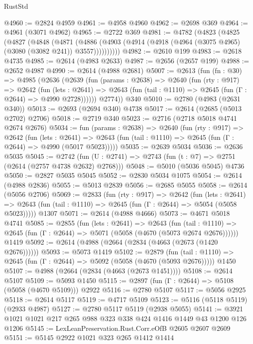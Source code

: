 \begin{lexlean}{RustStd}
\begin{coremodule}
@4960 := @2824 @4959
@4961 := @4958 @4960
@4962 := @2698 @369
@4964 := @4961 (@3071 @4962)
@4965 := @2722 @369
@4981 := @4782
    (@4823
      (@4825
        (@4827
          (@4848
            (@4871
              (@4886 (@4903 (@4914 (@4918 (@4964 (@3075 @4965) (@3080 (@3082 @241)) @3557))))))))))
@4982 := @2610 @199
@4983 := @2618 @4735
@4985 := @2614 (@4983 @2633)
@4987 := @2656 (@2657 @199)
@4988 := @2652 @4987
@4990 := @2614 (@4988 @2681)
@5007 := @2613
    (fun (fn : @30) =>
    @4985
      (@2636
        (@2639
          (fun (params : @2638) =>
          @2640
            (fun (rty : @917) =>
            @2642
              (fun (lets : @2641) =>
              @2643 (fun (tail : @1110) => @2645 (fun (Γ : @2644) => @4990 @2728))))))
        @2774))
    @340
@5010 := @2780 (@4983 (@2631 @340))
@5013 := @2693 (@2694 @340) @4738
@5017 := @2614 (@2685 (@5013 @2702) @2706)
@5018 := @2719 @340
@5023 := @2716 (@2718 @5018 @4741 @2674 @2676)
@5034 := fun (params : @2638) =>
  @2640
    (fun (rty : @917) =>
    @2642
      (fun (lets : @2641) =>
      @2643 (fun (tail : @1110) => @2645 (fun (Γ : @2644) => @4990 (@5017 @5023)))))
@5035 := @2639 @5034
@5036 := @2636 @5035
@5045 := @2742 (fun (U : @2741) => @2743 (fun (t : @7) => @2751 (@2614 (@2757 @4738 @2632) @2768)))
@5048 := @5010 (@5036 @5045) @4736
@5050 := @2827 @5035 @5045
@5052 := @2830 @5034 @1075
@5054 := @2614 (@4988 @2836)
@5055 := @5013 @2839
@5056 := @2685 @5055
@5058 := @2614 (@5056 @2706)
@5069 := @2833
    (fun (rty : @917) =>
    @2642
      (fun (lets : @2641) =>
      @2643 (fun (tail : @1110) => @2645 (fun (Γ : @2644) => @5054 (@5058 @5023)))))
    @1307
@5071 := @2614 (@4988 @4666)
@5073 := @4671 @5018 @4741
@5085 := @2855
    (fun (lets : @2641) =>
    @2643
      (fun (tail : @1110) => @2645 (fun (Γ : @2644) => @5071 (@5058 (@4670 (@5073 @2674 @2676))))))
    @1419
@5092 := @2614 (@4988 (@2664 (@2834 (@4663 (@2673 (@1420 @2676))))))
@5093 := @5073 @1419
@5102 := @2879
    (fun (tail : @1110) => @2645 (fun (Γ : @2644) => @5092 (@5058 (@4670 (@5093 @2676)))))
    @1450
@5107 := @4988 (@2664 (@2834 (@4663 (@2673 @1451))))
@5108 := @2614 @5107
@5109 := @5093 @1450
@5115 := @2897 (fun (Γ : @2644) => @5108 (@5058 (@4670 @5109))) @2922
@5116 := @2780 @5107
@5117 := @5056 @2925
@5118 := @2614 @5117
@5119 := @4717 @5109
@5123 := @5116 (@5118 @5119) (@2933 @4987)
@5127 := @2780 @5117 @5119 (@2938 @5055)
@5141 := @3921 @1021 @1021 @217 @265 @988 @323 @338 @424 @1416 @1449 @43 @1200 @126 @1206
@5145 := LexLeanPreservation.Rust.Corr.eOfB @2605 @2607 @2609
@5151 := @5145 @2922 @1021 @323 @265 @1412 @1414

\end{coremodule}
\end{lexlean}
